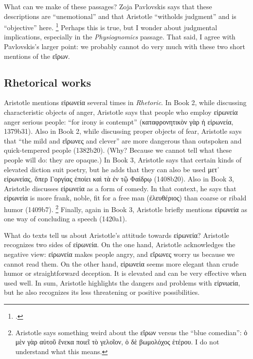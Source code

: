 \documentclass[12pt,letterpaper]{article}
\begin{document}
What can we make of these passages?
Zoja Pavlovskis says that these descriptions are ``unemotional'' and that Aristotle ``witholds judgment'' and is ``objective'' here.%
\footcite[][23]{pavlovskis-aristotle-horace-ironic-man-1968}
Perhaps this is true, but I wonder about judgmental implications, especially in the \textit{Physiognomics} passage.
That said, I agree with Pavlovskis's larger point: we probably cannot do very much with these two short mentions of the \textgreek{εἴρων}.

\subsection*{Rhetorical works}

Aristotle mentions \textgreek{εἰρωνεία} several times in \textit{Rhetoric}.
In Book 2, while discussing characteristic objects of anger, Aristotle says that people who employ \textgreek{εἰρωνεία} anger serious people: ``for irony is contempt'' (\textgreek{καταφρονητικὸν γὰρ ἡ εἰρωνεία}, 1379b31).
Also in Book 2, while discussing proper objects of fear, Aristotle says that ``the mild and \textgreek{εἴρωνες} and clever'' are more dangerous than outspoken and quick-tempered people (1382b20).
(Why?
Because we cannot tell what these people will do: they are opaque.)
In Book 3, Aristotle says that certain kinds of elevated diction suit poetry, but he adds that they can also be used \textgreek{μετ᾿ εἰρωνείας, ὅπερ Γοργίας ἐποίει καὶ τὰ ἐν τῷ Φαίδρῳ} (1408b20).
Also in Book 3, Aristotle discusses \textgreek{εἰρωνεία} as a form of comedy.
In that context, he says that \textgreek{εἰρωνεία} is more frank, noble, fit for a free man (\textgreek{ἐλευθέριος}) than coarse or ribald humor (1409b7).
\footnote{Aristotle says something weird about the \textgreek{εἴρων} versus the ``blue comedian'': \textgreek{ὁ μὲν γὰρ αὑτοῦ ἕνεκα ποιεῖ τὸ γελοῖον, ὁ δὲ βωμολόχος ἑτέρου}. %
I do not understand what this means.}
Finally, again in Book 3, Aristotle briefly mentions \textgreek{εἰρωνεία} as one way of concluding a speech (1420a1).

What do texts tell us about Aristotle's attitude towards \textgreek{εἰρωνεία}?
Aristotle recognizes two sides of \textgreek{εἰρωνεία}.
On the one hand, Aristotle acknowledges the negative view: \textgreek{εἰρωνεία} makes people angry, and \textgreek{εἴρωνες} worry us because we cannot read them.
On the other hand, \textgreek{εἰρωνεία} seems more elegant than crude humor or straightforward deception.
It is elevated and can be very effective when used well.
In sum, Aristotle highlights the dangers and problems with \textgreek{εἰρνωεία}, but he also recognizes its less threatening or positive possibilities.
\end{document}
